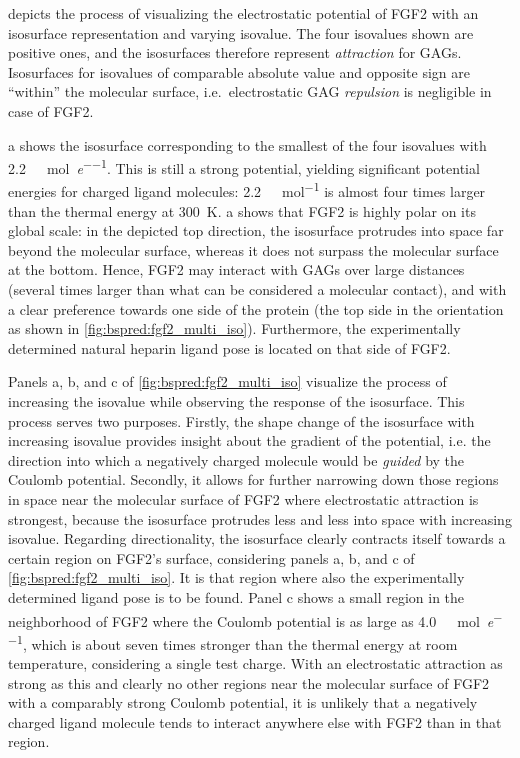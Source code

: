  depicts the process of visualizing the
electrostatic potential of FGF2 with an isosurface representation and varying
isovalue. The four isovalues shown are positive ones, and the isosurfaces
therefore represent \textit{attraction} for GAGs. Isosurfaces for isovalues of
comparable absolute value and opposite sign are \enquote{within} the molecular
surface, i.e.\ electrostatic GAG \textit{repulsion} is negligible in case of
FGF2.

a shows the isosurface corresponding to the
smallest of the four isovalues with
\SI{2.2}{\kilo\calory\per\mole\per\elementarycharge}. This is still a strong
potential, yielding significant potential energies for charged ligand molecules:
\SI{2.2}{\kilo\calory\per\mole} is almost four times larger than the thermal
energy at \SI{300}{\kelvin}. a shows that FGF2
is highly polar on its global scale: in the depicted top direction, the
isosurface protrudes into space far beyond the molecular surface, whereas it
does not surpass the molecular surface at the bottom. Hence, FGF2 may interact
with GAGs over large distances (several times larger than what can be considered
a molecular contact), and with a clear preference towards one side of the
protein (the top side in the orientation as shown in
\cref{fig:bspred:fgf2_multi_iso}). Furthermore, the experimentally determined
natural heparin ligand pose is located on that side of FGF2.

Panels a, b, and c of \cref{fig:bspred:fgf2_multi_iso} visualize the process of
increasing the isovalue while observing the response of the isosurface. This
process serves two purposes. Firstly, the shape change of the isosurface with
increasing isovalue provides insight about the gradient of the potential, i.e.
the direction into which a negatively charged molecule would be \textit{guided}
by the Coulomb potential. Secondly, it allows for further narrowing down those
regions in space near the molecular surface of FGF2 where electrostatic
attraction is strongest, because the isosurface protrudes less and less into
space with increasing isovalue. Regarding directionality, the isosurface clearly
contracts itself towards a certain region on FGF2's surface, considering panels
a, b, and c of \cref{fig:bspred:fgf2_multi_iso}. It is that region where also
the experimentally determined ligand pose is to be found. Panel c shows a small
region in the neighborhood of FGF2 where the Coulomb potential is as large as
\SI{4.0}{\kilo\calory\per\mole\per\elementarycharge}, which is about seven times
stronger than the thermal energy at room temperature, considering a single test
charge. With an electrostatic attraction as strong as this and clearly no other
regions near the molecular surface of FGF2 with a comparably strong Coulomb
potential, it is unlikely that a negatively charged ligand molecule tends to
interact anywhere else with FGF2 than in that region.

